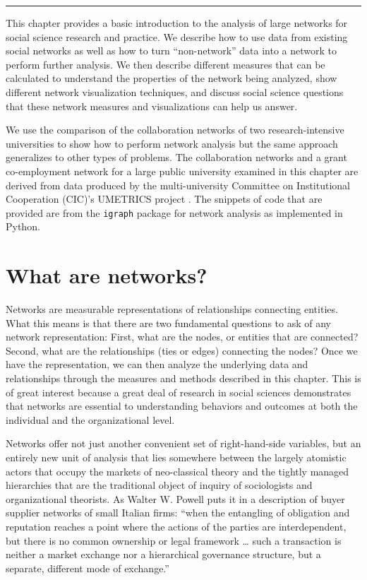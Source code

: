 \documentclass[]{krantz}
\begin{document}
\begin{center}\rule{0.5\linewidth}{\linethickness}\end{center}

This chapter provides a basic introduction to the analysis of large
networks for social science research and practice. We describe how to
use data from existing social networks as well as how to turn
``non-network'' data into a network to perform further analysis. We then
describe different measures that can be calculated to understand the
properties of the network being analyzed, show different network
visualization techniques, and discuss social science questions that
these network measures and visualizations can help us answer.

We use the comparison of the collaboration networks of two
research-intensive universities to show how to perform network analysis
but the same approach generalizes to other types of problems. The
collaboration networks and a grant co-employment network for a large
public university examined in this chapter are derived from data
produced by the multi-university Committee on Institutional Cooperation
(CIC)'s UMETRICS project \citep{lane2015new}. The snippets of code that
are provided are from the \texttt{igraph} package for network analysis
as implemented in Python.

\section{What are networks?}\label{what-are-networks}

Networks are measurable representations of relationships connecting
entities. What this means is that there are two fundamental questions to
ask of any network representation: First, what are the nodes, or
entities that are connected? Second, what are the relationships (ties or
edges) connecting the nodes? Once we have the representation, we can
then analyze the underlying data and relationships through the measures
and methods described in this chapter. This is of great interest because
a great deal of research in social sciences demonstrates that networks
are essential to understanding behaviors and outcomes at both the
individual and the organizational level.

Networks offer not just another convenient set of right-hand-side
variables, but an entirely new unit of analysis that lies somewhere
between the largely atomistic actors that occupy the markets of
neo-classical theory and the tightly managed hierarchies that are the
traditional object of inquiry of sociologists and organizational
theorists. As Walter W. Powell \citeyearpar{powell2003neither} puts it
in a description of buyer supplier networks of small Italian firms:
``when the entangling of obligation and reputation reaches a point where
the actions of the parties are interdependent, but there is no common
ownership or legal framework \ldots{} such a transaction is neither a
market exchange nor a hierarchical governance structure, but a separate,
different mode of exchange.''
\end{document}
